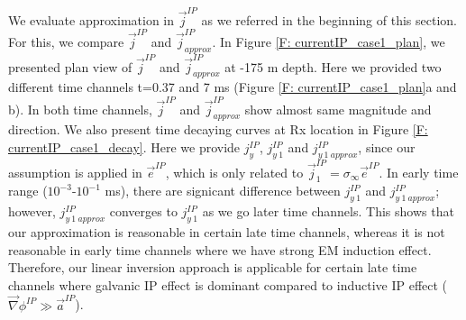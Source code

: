 \documentclass[a4paper, 11pt]{article}
\newcommand{\grad}{\vec \nabla}
\newcommand{\siginf}{\sigma_\infty}
\renewcommand {\j}  { {\vec j} }
\newcommand {\e}  { {\vec e} }
\begin{document}
We evaluate approximation in $\j^{IP}$ as we referred in the beginning of this section. For this, we compare $\j^{IP}$ and $\j^{IP}_{approx}$. In Figure \ref{F: currentIP_case1_plan}, we presented plan view of $\j^{IP}$ and $\j^{IP}_{approx}$ at -175 m depth. Here we provided two different time channels t=0.37 and 7 ms (Figure \ref{F: currentIP_case1_plan}a and b). In both time channels, $\j^{IP}$ and $\j^{IP}_{approx}$ show almost same magnitude and direction. We also present time decaying curves at Rx location in Figure \ref{F: currentIP_case1_decay}. Here we provide $j_y^{IP}$, $j_{y \ 1}^{IP}$ and $j_{y \ 1 \ approx}^{IP}$, since our assumption is applied in $\e^{IP}$, which is only related to $\j^{IP}_1=\siginf\e^{IP}$. In early time range ($10^{-3}$-$10^{-1}$ ms), there are signicant difference between $j_{y \ 1}^{IP}$ and $j_{y \ 1 \ approx}^{IP}$; however, $j_{y \ 1 \ approx}^{IP}$ converges to $j_{y \ 1}^{IP}$ as we go later time channels. This shows that our approximation is reasonable in certain late time channels, whereas it is not reasonable in early time channels where we have strong EM induction effect. Therefore, our linear inversion approach is applicable for certain late time channels where galvanic IP effect is dominant compared to inductive IP effect ($\grad\phi^{IP}\gg\vec{a}^{IP}$).
\end{document}

